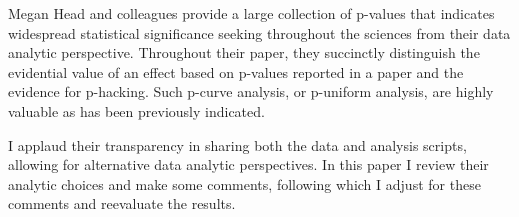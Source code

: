 Megan Head and colleagues provide a large collection of p-values that indicates widespread statistical significance seeking throughout the sciences from their data analytic perspective. Throughout their paper, they succinctly distinguish the evidential value of an effect based on p-values reported in a paper and the evidence for p-hacking. Such p-curve analysis, or p-uniform analysis, are highly valuable as has been previously indicated. 

I applaud their transparency in sharing both the data and analysis scripts, allowing for alternative data analytic perspectives. In this paper I review their analytic choices and make some comments, following which I adjust for these comments and reevaluate the results.